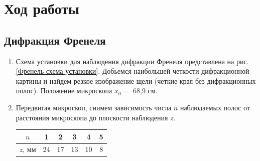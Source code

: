 \documentclass[a4paper, 12pt]{article}
\begin{document}
\section{Ход работы}
\subsection{Дифракция Френеля}

\begin{enumerate}
	\item Схема установки для наблюдения дифракции Френеля представлена на рис. \ref{Френель схема установки}. Добьемся наибольшей четкости дифракционной картины и найдем резкое изображение щели (четкие края без дифракционных полос). Положение микроскопа $x_0 = $ 68,9 см.

	\item Передвигая микроскоп, снимем зависимость числа $n$ наблюдаемых полос от расстояния микроскопа до плоскости наблюдения $z$.
	\begin{center}
		\begin{tabular}{|c|c|c|c|c|c|}
			\hline
			$n$ & 1    & 2    & 3    & 4    & 5    \\ \hline
			$z$, мм & 24 & 17 & 13 & 10 & 8 \\ \hline
		\end{tabular}
	\end{center}


\end{enumerate}
\end{document}
